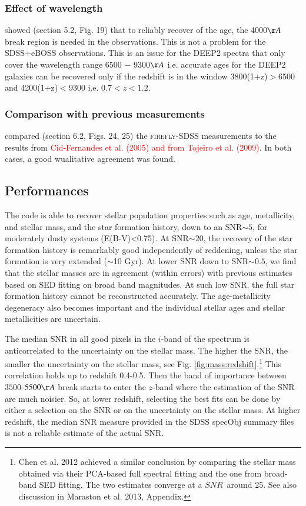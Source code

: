 \documentclass[onecolumn]{aa}
\begin{document}
\subsubsection{Effect of wavelength}
\citet{firefly2017MNRAS} showed (section 5.2, Fig. 19) that to reliably recover of the age, the 4000$\AA$ break region is needed in the observations. This is not a problem for the SDSS+eBOSS observations. This is an issue for the DEEP2 spectra that only cover the wavelength range 6500 − 9300$\AA$ i.e. accurate ages for the DEEP2 galaxies can be recovered only if the redshift is in the window 3800(1+z)$>$6500 and 4200(1+z)$<$9300 i.e. $0.7<z<1.2$.

\subsubsection{Comparison with previous measurements}
\citet{firefly2017MNRAS} compared (section 6.2, Figs. 24, 25) the \textsc{firefly}-SDSS measurements to the results from \textcolor{red}{Cid-Fernandes et al. (2005) and from Tojeiro et al. (2009)}. In both cases, a good wualitative agreement was found.

\subsection{Performances}
\label{subsec:firefly:performances}
The code is able to recover stellar population properties such as age, metallicity, and stellar mass, and the star formation history, 
down to an SNR$\sim5$, for moderately dusty systems (E(B-V)<0.75). 
At SNR$\sim20$, the recovery of the star formation history is remarkably good independently of reddening, unless the star formation is very extended ($\sim$10 Gyr). 
At lower SNR down to SNR$\sim0.5$, we find that the stellar masses are in agreement (within errors) with previous estimates based on SED fitting on broad band magnitudes. 
At such low SNR, the full star formation history cannot be reconstructed accurately. The age-metallicity degeneracy also becomes important and the individual stellar ages and stellar metallicities are uncertain.

The median SNR in all good pixels in the $i$-band of the spectrum is anticorrelated to the uncertainty on the stellar mass. The higher the SNR, the smaller the uncertainty on the stellar mass, see Fig. \ref{fig:mass:redshift}.\footnote{Chen et al. 2012 achieved a similar conclusion by comparing the stellar mass obtained via their PCA-based full spectral fitting and the one from broad-band SED fitting. The two estimates converge at a $SNR$~around 25. See also discussion in Maraston et al. 2013, Appendix.} 
This correlation holds up to redshift 0.4-0.5. 
Then the band of importance between $3500$-$5500\AA$ break starts to enter the $z$-band where the estimation of the SNR are much noisier. 
So, at lower redshift, selecting the best fits can be done by either a selection on the SNR or on the uncertainty on the stellar mass. 
At higher redshift, the median SNR measure provided in the SDSS specObj summary files is not a reliable estimate of the actual SNR. 
\end{document}
